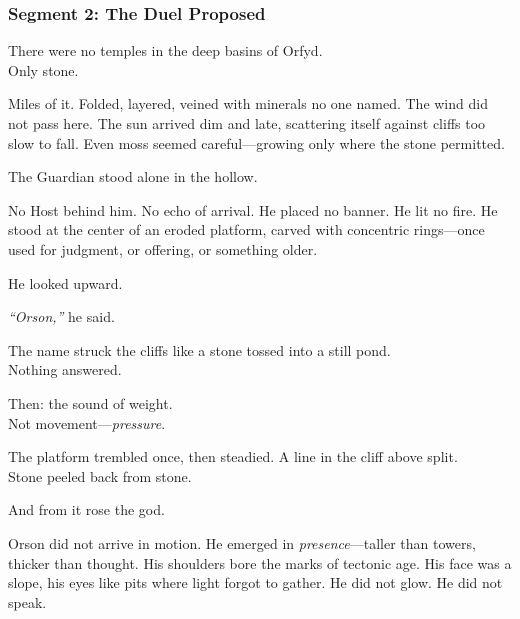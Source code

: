 \documentclass[9pt]{article}
\begin{document}
\newpage

\subsubsection*{Segment 2: The Duel Proposed}

There were no temples in the deep basins of Orfyd.\\
Only stone.

\vspace{0.5em}
Miles of it. Folded, layered, veined with minerals no one named. The wind did not pass here. The sun arrived dim and late, scattering itself against cliffs too slow to fall. Even moss seemed careful---growing only where the stone permitted.

\vspace{0.5em}
The Guardian stood alone in the hollow.

\vspace{0.5em}
No Host behind him. No echo of arrival. He placed no banner. He lit no fire. He stood at the center of an eroded platform, carved with concentric rings---once used for judgment, or offering, or something older.

\vspace{0.5em}
He looked upward.

\vspace{0.5em}
\textit{``Orson,''} he said.

\vspace{0.5em}
The name struck the cliffs like a stone tossed into a still pond.\\
Nothing answered.

\vspace{0.5em}
Then: the sound of weight.\\
Not movement---\textit{pressure}.

\vspace{0.5em}
The platform trembled once, then steadied. A line in the cliff above split.\\
Stone peeled back from stone.

\vspace{0.5em}
And from it rose the god.

\vspace{0.5em}
Orson did not arrive in motion. He emerged in \textit{presence}---taller than towers, thicker than thought. His shoulders bore the marks of tectonic age. His face was a slope, his eyes like pits where light forgot to gather. He did not glow. He did not speak.
\end{document}
